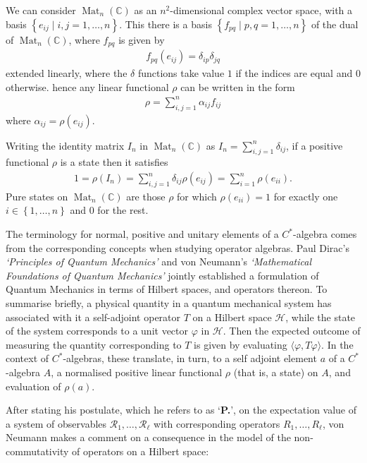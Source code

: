 \documentclass[11pt,a4paper]{report}
\theoremstyle{plain}
\theoremstyle{definition}
\newcommand{\1}{\mathbbm{1}}
\newcommand{\C}{\mathbb{C}}
\renewcommand{\H}{\mathcal{H}}
\renewcommand{\phi}{\varphi}
\DeclareMathOperator{\Mat}{\operatorname{Mat}}
\begin{document}
We can consider $\Mat_n(\C)$ as an $n^2$-dimensional complex vector space, with 
a basis $\left\{e_{ij} \mid i,j =1,\dots,n\right\}$. This there is a basis 
$\left\{f_{pq} \mid p,q =1,\dots,n\right\}$ of the dual of $\Mat_n(\C)$, where 
$f_{pq}$ is given by 
\begin{align*}
	f_{pq}(e_{ij}) = \delta_{ip}\delta_{jq}
\end{align*}
extended linearly, where the $\delta$ functions take value $1$ if the indices 
are equal and $0$ otherwise. hence any linear functional $\rho$ can be written 
in the form
\begin{align*}
	\rho = \sum_{i,j=1}^n \alpha_{ij}f_{ij}
\end{align*}
where $\alpha_{ij}=\rho(e_{ij})$.

Writing the identity matrix $I_n$ in $\Mat_n(\C)$ as $I_n =
\sum_{i,j=1}^n\delta_{ij}$, if a positive functional $\rho$ is a state then it 
satisfies
\begin{align*}
	1 = \rho(I_n) = \sum_{i,j=1}^n\delta_{ij}\rho(e_{ij}) = \sum_{i=1}^n\rho(e_{ii}).
\end{align*}
Pure states on $\Mat_n(\C)$ are those $\rho$ for which $\rho(e_{ii})=1$ for 
exactly one $i \in \left\{1,\dots,n\right\}$ and $0$ for the rest.




The terminology for normal, positive and unitary elements of a $C^\ast$-algebra 
comes from the corresponding concepts when studying operator algebras. 
Paul Dirac's \emph{`Principles of Quantum Mechanics'} \cite{dirac} and von 
Neumann's \emph{`Mathematical Foundations of Quantum Mechanics'} 
\cite{vonneumann32} jointly established a formulation of Quantum Mechanics in 
terms of Hilbert spaces, and operators thereon. To summarise briefly, a physical 
quantity in a quantum mechanical system has associated with it a self-adjoint 
operator $T$ on a Hilbert space $\H$,  while the state of the system corresponds 
to a unit vector $\phi$ in $\H$. Then the expected outcome of measuring the 
quantity corresponding to $T$ is given by evaluating $\langle\phi, 
T\phi\rangle$. In the context of $C^\ast$-algebras, these translate, in turn, to 
a self adjoint element $a$ of a $C^\ast$-algebra $A$, a normalised positive 
linear functional $\rho$ (that is, a state) on $A$, and evaluation of $\rho(a)$.


After stating his postulate, which he refers to as `\textbf{P.}', on the 
expectation value of a system of observables 
$\mathscr{R_1},\dots,\mathscr{R_\ell}$ with corresponding operators $R_1,\dots, 
R_\ell$, von Neumann makes a comment on a consequence in the model of the 
non-commutativity of operators on a Hilbert space:
\end{document}
